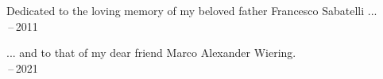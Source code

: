 
\thispagestyle{empty}



\vspace*{3cm}

\begin{center}
Dedicated to the loving memory of my beloved father Francesco Sabatelli ... \\ \,--\,2011
\end{center}

\vspace*{3cm}

\begin{center}
... and to that of my dear friend Marco Alexander Wiering. \\ \,--\,2021
\end{center}
